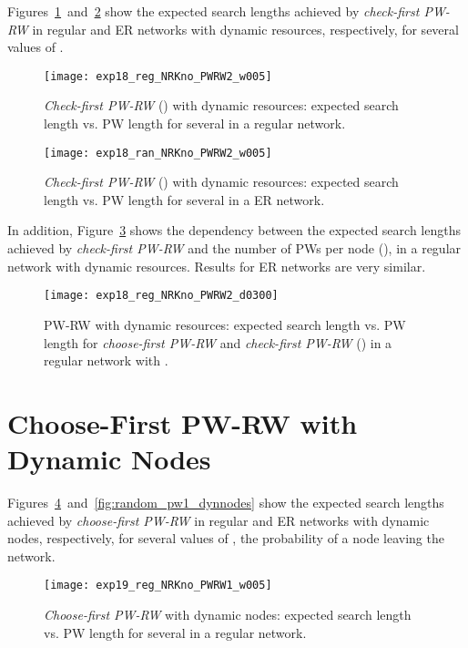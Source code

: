 \documentclass[]{elsarticle}
\begin{document}
Figures~\ref{fig:regular_pw2}~and~\ref{fig:random_pw2} show the expected search lengths achieved by \emph{check-first PW-RW} in regular and ER networks with dynamic resources, respectively, for several values of .

\begin{figure}[h]
 \centering
 \texttt{[image: exp18\_reg\_NRKno\_PWRW2\_w005]}
 \caption{\emph{Check-first PW-RW} () with dynamic resources: expected search length  vs. PW length  for several  in a regular network.}
 \label{fig:regular_pw2}
\end{figure}

\begin{figure}[h]
 \centering
 \texttt{[image: exp18\_ran\_NRKno\_PWRW2\_w005]}
 \caption{\emph{Check-first PW-RW} () with dynamic resources: expected search length  vs. PW length  for several  in a ER network.}
 \label{fig:random_pw2}
\end{figure}

In addition, Figure~\ref{fig:regular_pw1_pw2} shows the dependency between the expected search lengths achieved by \emph{check-first PW-RW} and the number of PWs per node (), in a regular network with dynamic resources. Results for ER networks are very similar.

\begin{figure}[h]
 \centering
 \texttt{[image: exp18\_reg\_NRKno\_PWRW2\_d0300]}
 \caption{PW-RW with dynamic resources: expected search length  vs. PW length  for \emph{choose-first PW-RW} and \emph{check-first PW-RW} () in a regular network with .}
 \label{fig:regular_pw1_pw2}
\end{figure}

\section{Choose-First PW-RW with Dynamic Nodes}

Figures~\ref{fig:regular_pw1_dynnodes}~and~\ref{fig:random_pw1_dynnodes} show the expected search lengths achieved by \emph{choose-first PW-RW} in regular and ER networks with dynamic nodes, respectively, for several values of , the probability of a node leaving the network.

\begin{figure}[h]
 \centering
 \texttt{[image: exp19\_reg\_NRKno\_PWRW1\_w005]}
 \caption{\emph{Choose-first PW-RW} with dynamic nodes: expected search length  vs. PW length  for several  in a regular network.}
 \label{fig:regular_pw1_dynnodes}
\end{figure}
\end{document}
